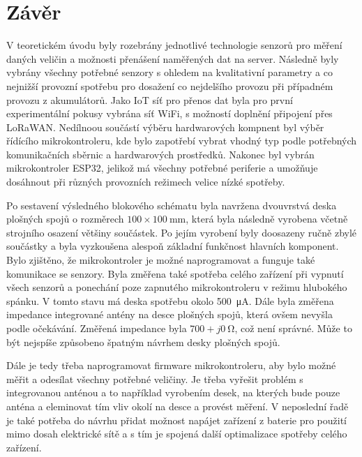 \chapter*{Závěr}
{}

V teoretickém úvodu byly rozebrány jednotlivé technologie senzorů pro měření daných veličin a možnosti přenášení naměřených dat na server. Následně byly vybrány všechny potřebné senzory s ohledem na kvalitativní parametry a co nejnižší provozní spotřebu pro dosažení co nejdelšího provozu při případném provozu z akumulátorů. Jako IoT síť pro přenos dat byla pro první experimentální pokusy vybrána síť WiFi, s možností doplnění připojení přes LoRaWAN. Nedílnoou součástí výběru hardwarových kompnent byl výběr řídícího mikrokontroleru, kde bylo zapotřebí vybrat vhodný typ podle potřebných komunikačních sběrnic a hardwarových prostředků. Nakonec byl vybrán mikrokontroler ESP32, jelikož má všechny potřebné periferie a umožňuje dosáhnout při různých provozních režimech velice nízké spotřeby.

Po sestavení výsledného blokového schématu byla navržena dvouvrstvá deska plošných spojů o rozměrech $100\times\SI{100}{\milli\metre}$, která byla následně vyrobena včetně strojního osazení většiny součástek. Po jejím vyrobení byly doosazeny ručně zbylé součástky a byla vyzkoušena alespoň základní funkčnost hlavních komponent. Bylo zjištěno, že mikrokontroler je možné naprogramovat a funguje také komunikace se senzory. Byla změřena také spotřeba celého zařízení při vypnutí všech senzorů a ponechání poze zapnutého mikrokontroleru v režimu hlubokého spánku. V tomto stavu má deska spotřebu okolo \SI{500}{\micro\ampere}. Dále byla změřena impedance integrované antény na desce plošných spojů, která ovšem nevyšla podle očekávání. Změřená impedance byla $700+j\SI{0}{\ohm}$, což není správné. Může to být nejspíše způsobeno špatným návrhem desky plošných spojů.

Dále je tedy třeba naprogramovat firmware mikrokontroleru, aby bylo možné měřit a odesílat všechny potřebné veličiny. Je třeba vyřešit problém s integrovanou anténou a to například vyrobením desek, na kterých bude pouze anténa a eleminovat tím vliv okolí na desce a provést měření. V neposlední řadě je také potřeba do návrhu přidat možnost napájet zařízení z baterie pro použití mimo dosah elektrické sítě a s tím je spojená další optimalizace spotřeby celého zařízení.
